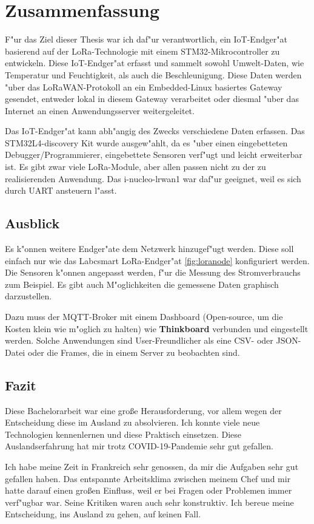 \chapter{Zusammenfassung}\label{Fazit}

F"ur das Ziel dieser Thesis war ich daf"ur 
verantwortlich, ein IoT-Endger"at basierend auf der 
LoRa-Technologie mit einem STM32-Mikrocontroller zu 
entwickeln. Diese IoT-Endger"at erfasst und sammelt 
sowohl Umwelt-Daten, wie Temperatur und Feuchtigkeit, 
als auch die Beschleunigung. Diese Daten werden "uber 
das LoRaWAN-Protokoll an ein Embedded-Linux basiertes 
Gateway gesendet, entweder lokal in diesem Gateway 
verarbeitet oder diesmal "uber das Internet an einen 
Anwendungsserver weitergeleitet. 

Das IoT-Endger"at kann abh"angig des Zwecks 
verschiedene Daten erfassen. Das STM32L4-discovery Kit 
wurde ausgew"ahlt, da es "uber einen eingebetteten 
Debugger/Programmierer, eingebettete Sensoren verf"ugt 
und leicht erweiterbar ist. Es gibt zwar viele 
LoRa-Module, aber allen passen nicht zu der zu 
realisierenden Anwendung. Das i-nucleo-lrwan1 war 
daf"ur geeignet, weil es sich durch UART ansteuern 
l"asst.

\section{Ausblick}

Es k"onnen weitere Endger"ate  dem Netzwerk 
hinzugef"ugt werden. Diese soll einfach nur wie das 
Labcsmart LoRa-Endger"at \ref{fig:loranode} 
konfiguriert werden. Die Sensoren k"onnen angepasst 
werden, f"ur die Messung des Stromverbrauchs zum 
Beispiel. Es gibt auch M"oglichkeiten die gemessene 
Daten graphisch darzustellen. 

Dazu muss der MQTT-Broker mit einem Dashboard 
(Open-source, um die Kosten klein wie m"oglich zu 
halten) wie \textbf{Thinkboard} verbunden und 
eingestellt werden. Solche Anwendungen sind 
User-Freundlicher als eine \ac{CSV}- oder JSON-Datei oder die 
Frames, die in einem Server zu beobachten sind.

\section{Fazit}

Diese Bachelorarbeit war eine gro\ss{}e 
Herausforderung, vor allem wegen der Entscheidung diese 
im Ausland zu absolvieren. Ich konnte viele neue 
Technologien kennenlernen und diese Praktisch einsetzen. 
Diese Auslandserfahrung  hat mir trotz 
COVID-19-Pandemie sehr gut gefallen. 

Ich habe meine Zeit in Frankreich sehr genossen, da mir 
die Aufgaben sehr gut gefallen haben. Das entspannte 
Arbeitsklima zwischen meinem Chef und mir hatte darauf 
einen gro\ss{}en Einfluss, weil er bei Fragen oder 
Problemen immer verf"ugbar war. Seine Kritiken waren 
auch sehr konstruktiv.  Ich bereue meine Entscheidung, 
ins Ausland zu gehen, auf keinen Fall.    

